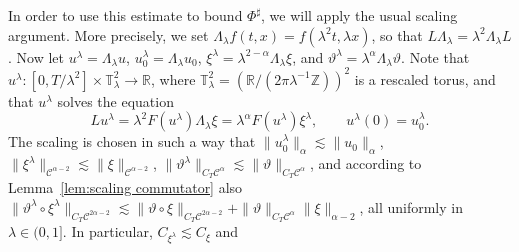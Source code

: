 \documentclass[11pt,a4paper]{article}
\newcommand{\mathd}{\mathrm{d}}
\theoremstyle{remark}
\newcommand{\R}{\mathbb{R}}
\newcommand{\Z}{\mathbb{Z}}
\newcommand{\CC}{\ensuremath{\mathscr{C}}}
\begin{document}
In order to use this estimate to bound $\Phi^{\sharp}$, we will apply the
usual scaling argument. More
precisely, we set $\Lambda_{\lambda} f ( t,x ) = f ( \lambda^{2} t, \lambda x)$, so that $L  \Lambda_{\lambda} = \lambda^{2} \Lambda_{\lambda} L$. Now let
$u^{\lambda} = \Lambda_{\lambda} u$, $u_0^\lambda = \Lambda_\lambda u_0$, $\xi^{\lambda} = \lambda^{2- \alpha} \Lambda_{\lambda} \xi$, and $\vartheta^{\lambda} = \lambda^{\alpha} \Lambda_{\lambda} \vartheta$. Note that $u^{\lambda} \colon [ 0,T/ \lambda^{2} ] \times \mathbb{T}_{\lambda}^{2} \rightarrow \mathbb{R}$, where
$\mathbb{T}_{\lambda}^{2} = (\R / (2\pi \lambda^{-1} \Z))^{2}$ is a rescaled torus,
and that $u^{\lambda}$ solves the equation
\[
   L u^{\lambda} = \lambda^{2} F ( u^{\lambda} ) \Lambda_{\lambda} \xi = \lambda^{\alpha} F ( u^{\lambda} ) \xi^{\lambda}, \qquad u^\lambda(0) = u^\lambda_0.
\]
The scaling is chosen in such a way that $\| u^\lambda_0 \|_\alpha \lesssim \|u_0\|_\alpha$, $\| \xi^{\lambda} \|_{\CC^{\alpha -2}} \lesssim \| \xi \|_{\CC^{\alpha -2}}$, $\| \vartheta^{\lambda} \|_{C_{T} \CC^\alpha} \lesssim \| \vartheta \|_{C_{T} \CC^\alpha}$, and according to Lemma~\ref{lem:scaling commutator} also $\| \vartheta^{\lambda} \circ \xi^{\lambda} \|_{C_{T} \CC^{2 \alpha -2}} \lesssim \| \vartheta \circ \xi \|_{C_{T} \CC^{2 \alpha -2}} + \|\vartheta\|_{C_T\CC^\alpha} \|\xi\|_{\alpha-2}$, all uniformly in $\lambda \in (0,1]$. In particular, $C_{\xi^{\lambda}} \lesssim C_{\xi}$ and
\end{document}
